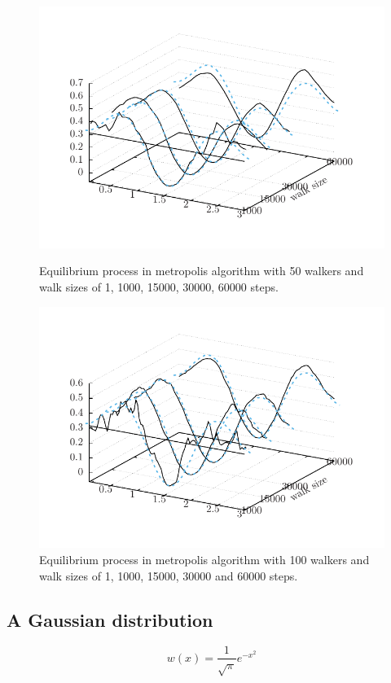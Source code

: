 \documentclass[11pt]{article}
\begin{document}
\begin{figure}[H]
  \centering

  \includegraphics[width=.8\linewidth]{metropolisEquilibrium-sincos50}
  \caption{Equilibrium process in metropolis algorithm with 50 walkers and walk sizes of 1, 1000, 15000, 30000, 60000 steps.}
\label{fig:metropolisEquilibrium-sincos50}

  \centering
  \includegraphics[width=.8\linewidth]{metropolisEquilibrium-sincos100}
  \caption{Equilibrium process in metropolis algorithm with 100 walkers and walk sizes of 1, 1000, 15000, 30000 and 60000 steps.}
\label{fig:metropolisEquilibrium-sincos100}
\end{figure}

\subsection{A Gaussian distribution}
\begin{equation*}
  w(x) = \frac{1}{\sqrt{\pi}}e^{-x^2}
\end{equation*}
\end{document}
